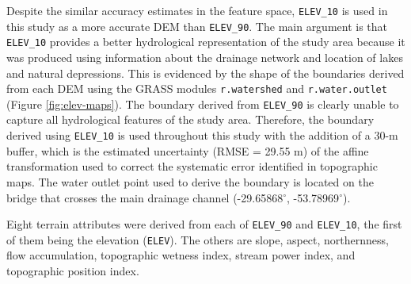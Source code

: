 
Despite the similar accuracy estimates in the feature space, \texttt{ELEV\_10} is used in this study as a more accurate DEM than \texttt{ELEV\_90}. The main argument is that \texttt{ELEV\_10} provides a better hydrological representation of the study area because it was produced using information about the drainage network and location of lakes and natural depressions. This is evidenced by the shape of the boundaries derived from each DEM using the GRASS modules \texttt{r.watershed} and \texttt{r.water.outlet} (Figure \ref{fig:elev-maps}). The boundary derived from \texttt{ELEV\_90} is clearly unable to capture all hydrological features of the study area. Therefore, the boundary derived using \texttt{ELEV\_10} is used throughout this study with the addition of a 30-m buffer, which is the estimated uncertainty (RMSE = 29.55 m) of the affine transformation used to correct the systematic error identified in topographic maps. The water outlet point used to derive the boundary is located on the bridge that crosses the main drainage channel (-29.65868$^\circ$, -53.78969$^\circ$).


Eight terrain attributes were derived from each of \texttt{ELEV\_90} and \texttt{ELEV\_10}, the first of them being the elevation (\texttt{ELEV}). The others are slope, aspect, northernness, flow accumulation, topographic wetness index, stream power index, and topographic position index.

